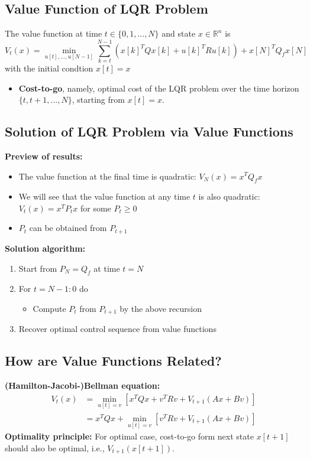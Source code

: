 \documentclass[10pt,a4paper,oneside]{article}
\begin{document}
\subsection{Value Function of LQR Problem}
The value function at time $t\in\{0,1,...,N\}$ and state $x\in\mathbb{R}^n$ is
\[
V_t(x)=\min_{u[t],...,u[N-1]}\sum_{k=t}^{N-1}(x[k]^TQx[k]+u[k]^TRu[k])+x[N]^TQ_fx[N]
\]
with the initial condtion $x[t]=x$
\begin{itemize}
\item {\bfseries Cost-to-go}, namely, optimal cost of the LQR problem over the time horizon $\{t,t+1,...,N\}$, starting from $x[t]=x$.
\end{itemize}
\subsection{Solution of LQR Problem via Value Functions}
{\bfseries Preview of results:}
\begin{itemize}
\item The value function at the final time is quadratic: $V_N(x)=x^TQ_fx$
\item We will see that the value function at any time $t$ is also quadratic: $V_t(x)=x^TP_tx$ for some $P_t\geqslant0$
\item $P_t$ can be obtained from $P_{t+1}$
\end{itemize}
{\bfseries Solution algorithm:}
\begin{enumerate}[(1)]
	\item Start from $P_N=Q_f$ at time $t=N$
	\item For $t=N-1:0$ do
	\begin{itemize}
	\item Compute $P_t$ from $P_{t+1}$ by the above recursion
	\end{itemize}
	\item Recover optimal control sequence from value functions
\end{enumerate}
\subsection{How are Value Functions Related?}
{\bfseries (Hamilton-Jacobi-)Bellman equation:}
$$
\begin{aligned}
V_t(x)&=\min_{u[t]=v}[x^TQx+v^TRv+V_{t+1}(Ax+Bv)]\\&=x^TQx+\min_{u[t]=v}[v^TRv+V_{t+1}(Ax+Bv)]
\end{aligned}
$$
{\bfseries Optimality principle: }For optimal case, cost-to-go form next state $x[t+1]$ should also be optimal, i.e., $V_{t+1}(x[t+1])$.
\end{document}
